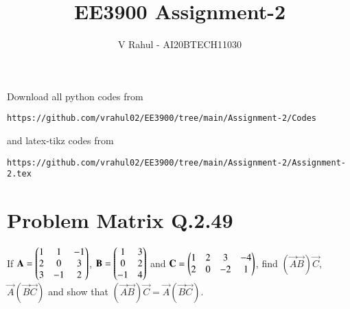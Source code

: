 \documentclass[journal,12pt,twocolumn]{IEEEtran}
\begin{document}
\title{EE3900 Assignment-2}
\author{V Rahul - AI20BTECH11030}
\maketitle
\newpage
\bigskip
\renewcommand{\thefigure}{\theenumi}
\renewcommand{\thetable}{\theenumi}
Download all python codes from 
\begin{lstlisting}
https://github.com/vrahul02/EE3900/tree/main/Assignment-2/Codes
\end{lstlisting}
%
and latex-tikz codes from 
%
\begin{lstlisting}
https://github.com/vrahul02/EE3900/tree/main/Assignment-2/Assignment-2.tex
\end{lstlisting}
\section*{Problem Matrix Q.2.49}
If $\mathbf{A}=\begin{pmatrix}1 & 1 & -1\\2 & 0 & 3\\3 & -1 & 2\end{pmatrix}$, $\mathbf{B}=\begin{pmatrix}1 & 3\\0 & 2\\-1 & 4\end{pmatrix}$ and $\mathbf{C} = \begin{pmatrix}1 & 2 & 3 & -4\\2 & 0 & -2 & 1\end{pmatrix}$, find $(\vec{A}\vec{B})\vec{C}$, $\vec{A}(\vec{B}\vec{C})$ and show that $(\vec{A}\vec{B})\vec{C}=\vec{A}(\vec{B}\vec{C})$.
\end{document}
